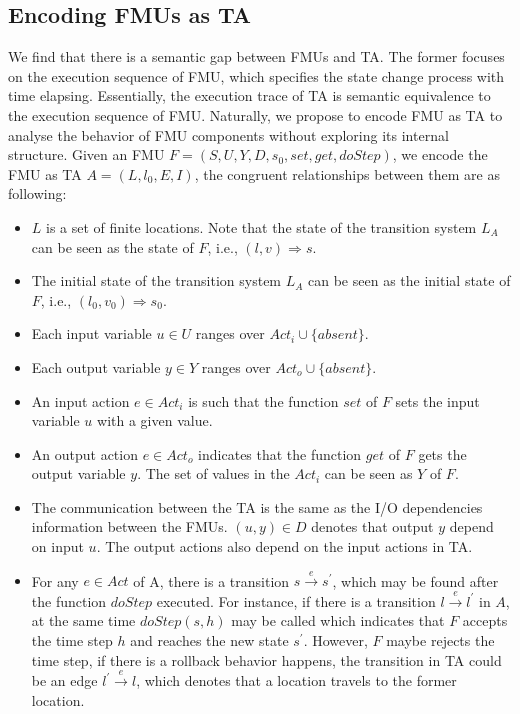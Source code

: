 \subsection{Encoding FMUs as TA}
We find that there is a semantic gap between FMUs and TA. The former focuses on the execution sequence of FMU, which specifies the state change process with time elapsing. Essentially, the execution trace of TA is semantic equivalence to the execution sequence of FMU. Naturally, we propose to encode FMU as TA to analyse the behavior of FMU components without exploring its internal structure. 
Given an FMU $F=(S,U,Y,D,s_{0},set,get,doStep)$, we encode the FMU as TA $\textit{A}=(L,l_{0},E,I)$, the congruent relationships between them are as following:
\begin{itemize}
\item
$L$ is a set of finite locations. Note that the state of the transition system $L_{\textit{A}}$ can be seen as the state of $F$, i.e., $(l,v) \Rightarrow s$.
\item
The initial state of the transition system $L_{\textit{A}}$ can be seen as the initial state of $F$, i.e., $(l_{0},v_{0}) \Rightarrow s_{0}$. 
\item
Each input variable $u \in U$ ranges over $Act_{i} \cup \{absent\}$.
\item
Each output variable $y \in Y$ ranges over $Act_{o} \cup \{absent\}$.
\item
An input action $e \in Act_{i}$ is such that the function $set$ of $F$ sets the input variable $u$ with a given value. 
\item
An output action $e \in Act_{o}$ indicates that the function $get$ of $F$ gets the output variable $y$. The set of values in the $Act_{i}$ can be seen as $Y$ of $F$.  
\item
The communication between the TA is the same as the I/O dependencies information between the FMUs. $(u,y) \in D$ denotes that output $y$ depend on input $u$. The output actions also depend on the input actions in TA.
\item
For any $e \in Act$ of A, there is a transition $s \xrightarrow{e} s^{\prime}$, which may be found after the function $doStep$ executed. For instance, if there is a transition $l \xrightarrow{e} l^{\prime}$ in $A$, at the same time $doStep(s,h)$ may be called which indicates that $F$ accepts the time step $h$ and reaches the new state $s^{\prime}$. However, $F$ maybe rejects the time step, if there is a rollback behavior happens, the transition in TA could be an edge $l^{\prime} \xrightarrow{e} l$, which denotes that a location travels to the former location.

\end{itemize}
